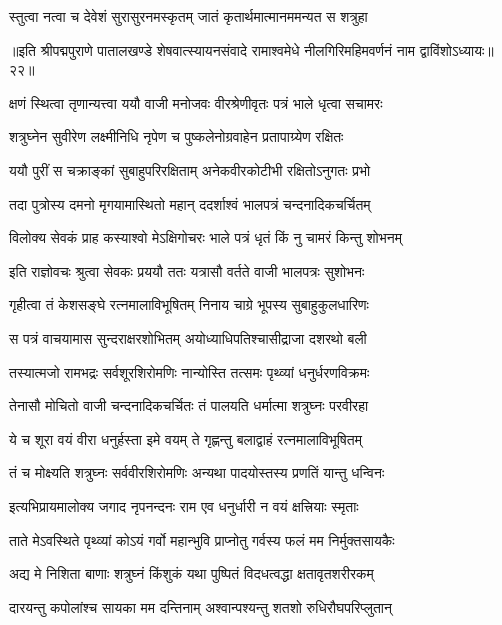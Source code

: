 \twolineshloka
{स्तुत्वा नत्वा च देवेशं सुरासुरनमस्कृतम्}
{जातं कृतार्थमात्मानममन्यत स शत्रुहा}%

॥इति श्रीपद्मपुराणे पातालखण्डे शेषवात्स्यायनसंवादे रामाश्वमेधे नीलगिरिमहिमवर्णनं नाम द्वाविंशोऽध्यायः॥२२॥



\twolineshloka
{क्षणं स्थित्वा तृणान्यत्त्वा ययौ वाजी मनोजवः}
{वीरश्रेणीवृतः पत्रं भाले धृत्वा सचामरः}%

\twolineshloka
{शत्रुघ्नेन सुवीरेण लक्ष्मीनिधि नृपेण च}
{पुष्कलेनोग्रवाहेन प्रतापाग्र्येण रक्षितः}%

\twolineshloka
{ययौ पुरीं स चक्राङ्कां सुबाहुपरिरक्षिताम्}
{अनेकवीरकोटीभी रक्षितोऽनुगतः प्रभो}%

\twolineshloka
{तदा पुत्रोस्य दमनो मृगयामास्थितो महान्}
{ददर्शाश्वं भालपत्रं चन्दनादिकचर्चितम्}%

\twolineshloka
{विलोक्य सेवकं प्राह कस्याश्वो मेऽक्षिगोचरः}
{भाले पत्रं धृतं किं नु चामरं किन्तु शोभनम्}%

\twolineshloka
{इति राज्ञोवचः श्रुत्वा सेवकः प्रययौ ततः}
{यत्रासौ वर्तते वाजी भालपत्रः सुशोभनः}%

\twolineshloka
{गृहीत्वा तं केशसङ्घे रत्नमालाविभूषितम्}
{निनाय चाग्रे भूपस्य सुबाहुकुलधारिणः}%

\twolineshloka
{स पत्रं वाचयामास सुन्दराक्षरशोभितम्}
{अयोध्याधिपतिश्चासीद्राजा दशरथो बली}%

\twolineshloka
{तस्यात्मजो रामभद्रः सर्वशूरशिरोमणिः}
{नान्योस्ति तत्समः पृथ्व्यां धनुर्धरणविक्रमः}%

\twolineshloka
{तेनासौ मोचितो वाजी चन्दनादिकचर्चितः}
{तं पालयति धर्मात्मा शत्रुघ्नः परवीरहा}%

\twolineshloka
{ये च शूरा वयं वीरा धनुर्हस्ता इमे वयम्}
{ते गृह्णन्तु बलाद्वाहं रत्नमालाविभूषितम्}%

\twolineshloka
{तं च मोक्ष्यति शत्रुघ्नः सर्ववीरशिरोमणिः}
{अन्यथा पादयोस्तस्य प्रणतिं यान्तु धन्विनः}%

\twolineshloka
{इत्यभिप्रायमालोक्य जगाद नृपनन्दनः}
{राम एव धनुर्धारी न वयं क्षत्त्रियाः स्मृताः}%

\twolineshloka
{ताते मेऽवस्थिते पृथ्व्यां कोऽयं गर्वो महान्भुवि}
{प्राप्नोतु गर्वस्य फलं मम निर्मुक्तसायकैः}%

\twolineshloka
{अद्य मे निशिता बाणाः शत्रुघ्नं किंशुकं यथा}
{पुष्पितं विदधत्वद्धा क्षतावृतशरीरकम्}%

\twolineshloka
{दारयन्तु कपोलांश्च सायका मम दन्तिनाम्}
{अश्वान्पश्यन्तु शतशो रुधिरौघपरिप्लुतान्}%

